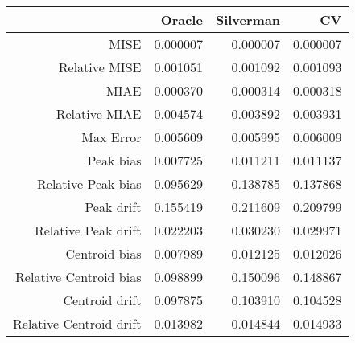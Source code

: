 \begin{tabular}{rrrr}
  \hline
 & Oracle & Silverman & CV \\ 
  \hline
MISE & 0.000007 & 0.000007 & 0.000007 \\ 
  Relative MISE & 0.001051 & 0.001092 & 0.001093 \\ 
  MIAE & 0.000370 & 0.000314 & 0.000318 \\ 
  Relative MIAE & 0.004574 & 0.003892 & 0.003931 \\ 
  Max Error & 0.005609 & 0.005995 & 0.006009 \\ 
  Peak bias & 0.007725 & 0.011211 & 0.011137 \\ 
  Relative Peak bias & 0.095629 & 0.138785 & 0.137868 \\ 
  Peak drift & 0.155419 & 0.211609 & 0.209799 \\ 
  Relative Peak drift & 0.022203 & 0.030230 & 0.029971 \\ 
  Centroid bias & 0.007989 & 0.012125 & 0.012026 \\ 
  Relative Centroid bias & 0.098899 & 0.150096 & 0.148867 \\ 
  Centroid drift & 0.097875 & 0.103910 & 0.104528 \\ 
  Relative Centroid drift & 0.013982 & 0.014844 & 0.014933 \\ 
   \hline
\end{tabular}
